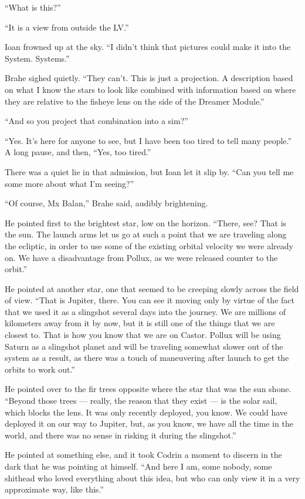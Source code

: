 ``What is this?''

``It is a view from outside the LV.''

Ioan frowned up at the sky. ``I didn't think that pictures could make it into the System. Systems.''

Brahe sighed quietly. ``They can't. This is just a projection. A description based on what I know the stars to look like combined with information based on where they are relative to the fisheye lens on the side of the Dreamer Module.''

``And so you project that combination into a sim?''

``Yes. It's here for anyone to see, but I have been too tired to tell many people.'' A long pause, and then, ``Yes, too tired.''

There was a quiet lie in that admission, but Ioan let it slip by. ``Can you tell me some more about what I'm seeing?''

``Of course, Mx Balan,'' Brahe said, audibly brightening.

He pointed first to the brightest star, low on the horizon. ``There, see? That is the sun. The launch arms let us go at such a point that we are traveling along the ecliptic, in order to use some of the existing orbital velocity we were already on. We have a disadvantage from Pollux, as we were released counter to the orbit.''

He pointed at another star, one that seemed to be creeping slowly across the field of view. ``That is Jupiter, there. You can see it moving only by virtue of the fact that we used it as a slingshot several days into the journey. We are millions of kilometers away from it by now, but it is still one of the things that we are closest to. That is how you know that we are on Castor. Pollux will be using Saturn as a slingshot planet and will be traveling somewhat slower out of the system as a result, as there was a touch of maneuvering after launch to get the orbits to work out.''

He pointed over to the fir trees opposite where the star that was the sun shone. ``Beyond those trees — really, the reason that they exist — is the solar sail, which blocks the lens. It was only recently deployed, you know. We could have deployed it on our way to Jupiter, but, as you know, we have all the time in the world, and there was no sense in risking it during the slingshot.''

He pointed at something else, and it took Codrin a moment to discern in the dark that he was pointing at himself. ``And here I am, some nobody, some shithead who loved everything about this idea, but who can only view it in a very approximate way, like this.''

